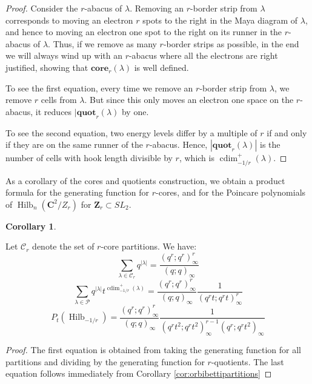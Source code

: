 \documentclass{amsart}[12pt]
\theoremstyle{definition}
\newtheorem{corollary}[dummy]{Corollary}
\newcommand{\Z}{\mathbf{Z}}
\newcommand{\C}{\mathbf{C}}
\newcommand{\core}{\mathbf{core}}
\newcommand{\quot}{\mathbf{quot}}
\newcommand{\cores}{\mathcal{C}}
\DeclareMathOperator{\Hilb}{Hilb}
\DeclareMathOperator{\cdim}{cdim}
\begin{document}
\begin{proof}


Consider the $r$-abacus of $\lambda$.  Removing an $r$-border strip from $\lambda$ corresponds to moving an electron $r$ spots to the right in the Maya diagram of $\lambda$, and hence to moving an electron one spot to the right on its runner in the $r$-abacus of $\lambda$.  Thus, if we remove as many $r$-border strips as possible, in the end we will always wind up with an $r$-abacus where all the electrons are right justified, showing that $\core_r(\lambda)$ is well defined.

To see the first equation, every time we remove an $r$-border strip from $\lambda$, we remove $r$ cells from $\lambda$.  But since this only moves an electron one space on the $r$-abacus, it reduces $|\quot_r(\lambda)$ by one.

To see the second equation, two energy levels differ by a multiple of $r$ if and only if they are on the same runner of the $r$-abacus.  Hence, $|\quot_r(\lambda)|$ is the number of cells with hook length divisible by $r$, which is $\cdim^+_{-1/r}(\lambda)$.

\end{proof}


As a corollary of the cores and quotients construction, we obtain a product formula for the generating function for $r$-cores, and for the Poincare polynomials of $\Hilb_n(\C^2/Z_r)$ for $\Z_r\subset SL_2$.

\begin{corollary} \label{cor:product-formulas-traditional-cores}

Let $\mathcal{C}_r$ denote the set of $r$-core partitions.  We have:
\begin{equation} \label{eq:cores-product}
  \sum_{\lambda\in\cores_r} q^{|\lambda|}=\frac{(q^r;q^r)_\infty^r}{(q;q)_\infty}
  \end{equation}
$$\sum_{\lambda\in\mathcal{P}} q^{|\lambda|} t^{\cdim^+_{-1/r}(\lambda)}=\frac{(q^r;q^r)_\infty^r}{(q;q)_\infty}\frac{1}{(q^rt;q^rt)_\infty^r}$$
$$P_t(\Hilb_{-1/r})=\frac{(q^r;q^r)_\infty^r}{(q;q)_\infty}\frac{1}{(q^rt^2;q^rt^2)_\infty^{r-1}(q^r;q^rt^2)_\infty}$$
\end{corollary}
\begin{proof}
The first equation is obtained from taking the generating function for all partitions and dividing by the generating function for $r$-quotients.  The last equation follows immediately from Corollary \ref{cor:orbibettipartitions}
\end{proof}
\end{document}
